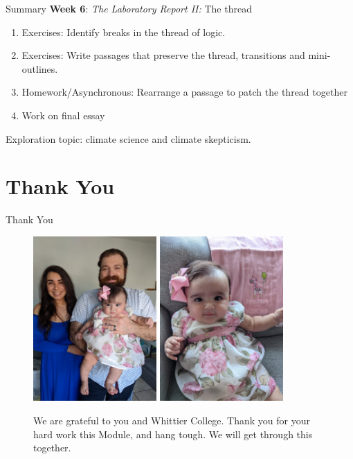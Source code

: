 \documentclass{beamer}
\begin{document}
\begin{frame}{Summary}
\small
\textbf{Week 6}: \textit{The Laboratory Report II:} The thread
\begin{enumerate}
\item Exercises: Identify breaks in the thread of logic.
\item Exercises: Write passages that preserve the thread, transitions and mini-outlines.
\item Homework/Asynchronous: Rearrange a passage to patch the thread together
\item Work on final essay
\end{enumerate}
Exploration topic: climate science and climate skepticism.
\end{frame}

\section{Thank You}

\begin{frame}{Thank You}
\begin{figure}
\centering
\includegraphics[width=0.42\textwidth]{figures/fam1.jpg}
\includegraphics[width=0.42\textwidth]{figures/fam2.jpg}
\caption{\label{fig:fams} We are grateful to you and Whittier College.  Thank you for your hard work this Module, and hang tough.  We will get through this together.}
\end{figure}
\end{frame}
\end{document}
